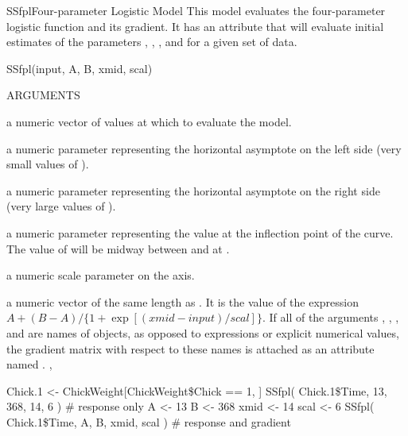 \documentclass[pdftex]{article} \usepackage{url,graphicx}
\begin{document}
\begin{Helpfile}{SSfpl}{Four-parameter Logistic Model}
This  model evaluates the four-parameter logistic
function and its gradient.  It has an  attribute that
will evaluate initial estimates of the parameters , ,
, and  for a given set of data.
\begin{Example}
SSfpl(input, A, B, xmid, scal)
\end{Example}
\begin{Argument}{ARGUMENTS}
\item[\Co{input:}]
a numeric vector of values at which to evaluate the model.
\item[\Co{A:}]
a numeric parameter representing the horizontal asymptote on
the left side (very small values of ).
\item[\Co{B:}]
a numeric parameter representing the horizontal asymptote on
the right side (very large values of ).
\item[\Co{xmid:}]
a numeric parameter representing the  value at the
inflection point of the curve.  The value of  will be
midway between  and  at .
\item[\Co{scal:}]
a numeric scale parameter on the  axis.
\end{Argument}
a numeric vector of the same length as .  It is the value of
the expression $A+(B-A)/\{1+\exp[(xmid-input)/scal]\}$.  If all of
the arguments , , , and  are
names of objects, as opposed to expressions or explicit numerical
values, the gradient matrix with respect to these names is attached as
an attribute named .
, 
\need 15pt
\vspace{-16pt} 
\begin{Example}
Chick.1 <- ChickWeight[ChickWeight\$Chick == 1, ]
SSfpl( Chick.1\$Time, 13, 368, 14, 6 )  # response only
A <- 13
B <- 368
xmid <- 14
scal <- 6
SSfpl( Chick.1\$Time, A, B, xmid, scal ) # response and gradient
\end{Example}
\end{Helpfile}
\end{document}
